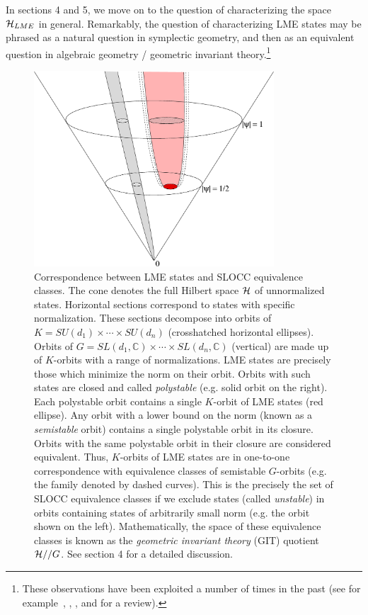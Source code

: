 \documentclass[12pt]{article}
\theoremstyle{definition}
\begin{document}
In sections 4 and 5, we move on to the question of
characterizing the space ${\cal H}_{LME}$ in general.
Remarkably, the question of characterizing LME states may be phrased as a natural question in symplectic
geometry, and then as an equivalent question in algebraic geometry / geometric invariant theory.\footnote{
These observations have been exploited a number of times in the past (see for example~\cite{Kly02}, \cite[\S~3]{Kly07}, \cite[\S~4]{wallach}, and \cite{Walter} for a review).}

 \begin{figure}
\centering
\includegraphics[width=0.8\textwidth]{cone.eps}
\caption{Correspondence between LME states and SLOCC equivalence classes. The cone denotes the full Hilbert space ${\cal H}$ of unnormalized states. Horizontal sections correspond to states with specific normalization. These sections decompose into orbits of $K = SU(d_1) \times \cdots \times SU(d_n)$ (crosshatched horizontal ellipses). Orbits of $G = SL(d_1, \mathbb{C}) \times \cdots \times SL(d_n,\mathbb{C})$ (vertical) are made up of $K$-orbits with a range of normalizations. LME states are precisely those which minimize the norm on their orbit. Orbits with such states are closed and called {\it polystable} (e.g. solid orbit on the right). Each polystable orbit contains a single $K$-orbit of LME states (red ellipse). Any orbit with a lower bound on the norm (known as a {\it semistable} orbit) contains a single polystable orbit in its closure. Orbits with the same polystable orbit in their closure are considered equivalent. Thus, $K$-orbits of LME states are in one-to-one correspondence with equivalence classes of semistable $G$-orbits (e.g. the family denoted by dashed curves). This is the precisely the set of SLOCC equivalence classes if we exclude states (called {\it unstable}) in orbits containing states of arbitrarily small norm (e.g. the orbit shown on the left). Mathematically, the space of these equivalence classes is known as the {\it geometric invariant theory} (GIT) quotient ${\cal H}//G$. See section 4 for a detailed discussion.}
\label{fig:cone}
\end{figure}
\end{document}

